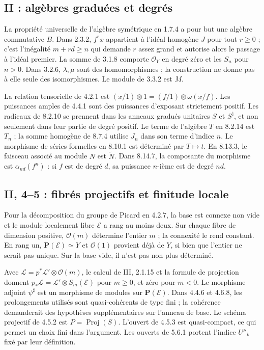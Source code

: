 \subsection{II : algèbres graduées et degrés}
\label{note:base2-graded}
La propriété universelle de l'algèbre symétrique en 1.7.4 a pour
but une algèbre commutative $B$. Dans 2.3.2, $f^rx$ appartient
à l'idéal homogène $J$ pour tout $r\geq0$ ; c'est l'inégalité
$m+rd\geq n$ qui demande $r$ assez grand et autorise alors
le passage à l'idéal premier. La somme de 3.1.8 comporte
$\mathcal O_Y$ en degré zéro et les $S_n$ pour $n>0$.
Dans 3.2.6, $\lambda,\mu$ sont des homomorphismes ; la construction
ne donne pas à elle seule des isomorphismes. Le module de 3.3.2
est $M$.

La relation tensorielle de 4.2.1 est
$(x/1)\otimes1=(f/1)\otimes\omega(x/f)$.
Les puissances amples de 4.4.1 sont des puissances d'exposant
strictement positif. Les radicaux de 8.2.10 se prennent dans
les anneaux gradués unitaires $S$ et $S^\natural$,
et non seulement dans leur partie de degré positif.
Le terme de l'algèbre $T$ en 8.2.14 est $T_n$ ; la somme homogène
de 8.7.4 utilise $J_n$ dans son terme d'indice $n$.
Le morphisme de séries formelles en 8.10.1 est déterminé par
$T\mapsto t$.
En 8.13.3, le faisceau associé au module $N$ est $\widetilde N$.
Dans 8.14.7, la composante du morphisme est
$\alpha_{nd}(f^n)$ : si $f$ est de degré $d$, sa puissance
$n$-ième est de degré $nd$.

\subsection{II, 4--5 : fibrés projectifs et finitude locale}
\label{note:base2-projective}
Pour la décomposition du groupe de Picard en 4.2.7, la base est
connexe non vide et le module localement libre $\mathcal E$ a
rang au moins deux. Sur chaque fibre de dimension positive,
$\mathcal O(m)$ détermine l'entier $m$ ; la connexité le rend
constant. En rang un, $\mathbf P(\mathcal E)\simeq Y$ et
$\mathcal O(1)$ provient déjà de $Y$, si bien que l'entier ne serait
pas unique. Sur la base vide, il n'est pas non plus déterminé.

Avec $\mathcal L=p^*\mathcal L'\otimes\mathcal O(m)$,
le calcul de III, 2.1.15 et la formule de projection donnent
$p_*\mathcal L=\mathcal L'\otimes S_m(\mathcal E)$ pour $m\geq0$,
et zéro pour $m<0$. Le morphisme adjoint $\psi^\sharp$ est un
morphisme de modules sur $\mathbf P(\mathcal E)$.
Dans 4.4.6 et 4.6.8, les prolongements utilisés sont
quasi-cohérents de type fini ; la cohérence demanderait des
hypothèses supplémentaires sur l'anneau de base.
Le schéma projectif de 4.5.2 est $P=\operatorname{Proj}(S)$.
L'ouvert de 4.5.3 est quasi-compact, ce qui permet un choix fini
dans l'argument. Les ouverts de 5.6.1 portent l'indice $U''_k$
fixé par leur définition.


